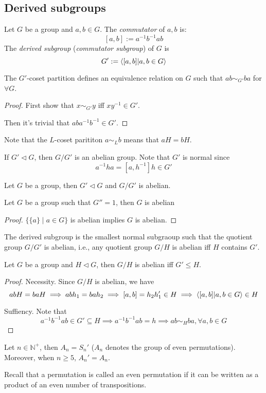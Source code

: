 \subsection{Derived subgroups}
\begin{definition}
Let $G$ be a group and $a,b\in G$. The \emph{commutator} of $a,b$ is:
\[
[a,b]:=a^{-1}b^{-1}ab
\]
The  \emph{derived subgroup} (\emph{commutator subgroup}) of $G$ is
\[
G':=\langle [a,b]| a,b\in G\rangle
\]
\end{definition}
\begin{proposition}
The $G'$-coset partition defines an equivalence relation on $G$ such that $ab\sim_{G'}ba$ for $\forall G$.
\end{proposition}
\begin{proof}
First show that $x\sim_{G'}y$  iff $xy^{-1}\in G'$.

Then it's trivial that $aba^{-1}b^{-1}\in G'$.
\end{proof}
Note that the $L$-coset parititon $a\sim_Lb$ means that $aH=bH$.
\begin{remark}
If $G'\triangleleft G$, then $G/G'$ is an abelian group. Note that $G'$ is normal since
\[
a^{-1}ha=[a,h^{-1}]h\in G'
\]
\end{remark}
\begin{theorem}
Let $G$ be a group, then $G'\triangleleft G$ and $G/G'$ is abelian.
\end{theorem}
\begin{corollary}
Let $G$ be a group such that $G''=1$, then $G$ is abelian
\end{corollary}
\begin{proof}
$\{\{a\}\mid a\in G\}$ is abelian implies $G$ is abelian.
\end{proof}
\begin{remark}
The derived subgroup is the smallest normal subgraoup such that the quotient group $G/G'$ is abelian, i.e., any quotient group $G/H$ is abelian iff $H$ contains $G'$.
\end{remark}
\begin{theorem}
Let $G$ be a group and $H\triangleleft G$, then $G/H$ is abelian iff $G'\le H$.
\end{theorem}
\begin{proof}
Necessity. Since $G/H$ is abelian, we have
\[
ab H=baH\implies
abh_1=bah_2\implies
[a,b]=h_2h_1'\in H\implies
\langle [a,b]|a,b\in G\rangle\in H
\]

Suffiency. Note that
\[
a^{-1}b^{-1}ab\in G'\subseteq H\implies
a^{-1}b^{-1}ab=h\implies
ab\sim_Hba,\forall a,b\in G
\]
\end{proof}
\begin{theorem}
Let $n\in\mathbb{N}^+$, then $A_n=S_n'$ ($A_n$ denotes the group of even permutations). Moreover, when $n\ge5$, $A_n'=A_n$.
\end{theorem}
Recall that a permutation is called an even permutation if it can be written as a product of an even number of transpositions.

